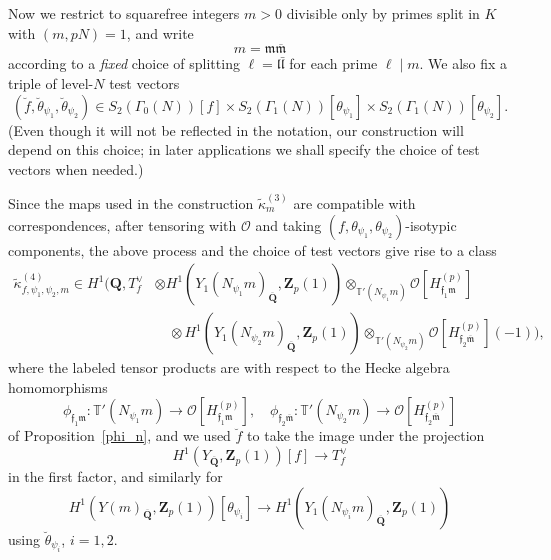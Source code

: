 \documentclass[10pt,letterpaper]{amsart}
\theoremstyle{plain}
\theoremstyle{definition}
\theoremstyle{definition}
\theoremstyle{plain}
\theoremstyle{plain}
\theoremstyle{plain}
\theoremstyle{remark}
\numberwithin{equation}{section}
\newcommand{\fkm}{\mathfrak{m}}
\newcommand{\fkmbar}{\overline{\mathfrak{m}}}
\newcommand{\fkf}{\mathfrak{f}}
\DeclareMathOperator{\et}{\acute{e}t}
\def\cO{\mathcal O}
\newcommand{\Q}{\mathbf{Q}}
\newcommand{\Z}{\mathbf{Z}}
\begin{document}
Now we restrict to squarefree integers $m>0$ divisible only by primes split in $K$ with $(m,pN)=1$, and write 
\[
m=\fkm\fkmbar
\]
according to a \emph{fixed} choice of splitting $\ell=\mathfrak{l}\bar{\mathfrak{l}}$ for each prime $\ell\mid m$. 
We also fix a triple of level-$N$ test vectors
\begin{equation}\label{eq:triple-222}
(\breve{f},\breve{\theta}_{\psi_1},\breve{\theta}_{\psi_2})\in S_2(\Gamma_0(N))[f]\times S_2(\Gamma_1(N))[\theta_{\psi_1}]\times S_2(\Gamma_1(N))[\theta_{\psi_2}].\nonumber
\end{equation}
(Even though it will not be reflected in the notation, our construction will depend on this choice; in later applications we shall specify the choice of test vectors when needed.) 

Since the maps used in the construction $\tilde{\kappa}^{(3)}_m$ are compatible with correspondences, after tensoring with $\cO$ and taking $(f,\theta_{\psi_1},\theta_{\psi_2})$-isotypic components, the above process and the choice of test vectors %
give rise to a class
\begin{align*}
\tilde{\kappa}_{f,\psi_1,\psi_2,m}^{(4)}\in H^1\bigl(\Q,T_{f}^{\vee}&\otimes H^1_{\et}(Y_1(N_{\psi_1}m)_{\overline{\Q}},\Z_p(1))\otimes_{\mathbb{T}'(N_{\psi_1}m)}\mathcal{O}[H_{\mathfrak{f}_1\fkm}^{(p)}]\\
 &\quad\otimes H^1_{\et}(Y_1(N_{\psi_2}m)_{\overline{\Q}},\Z_p(1))\otimes_{\mathbb{T}'(N_{\psi_2}m)}\mathcal{O}[H_{\mathfrak{f}_2\fkmbar}^{(p)}](-1)\bigr),
\end{align*}
where the labeled tensor products are with respect to the Hecke algebra homomorphisms
\begin{equation}\label{eq:rayclass-str}
\phi_{\mathfrak{f}_1\fkm}:\mathbb{T}'(N_{\psi_1}m)\rightarrow\mathcal{O}[H_{\mathfrak{f}_1\fkm}^{(p)}],\quad 
\phi_{\mathfrak{f}_2\fkmbar}:\mathbb{T}'(N_{\psi_2}m)\rightarrow\mathcal{O}[H_{\mathfrak{f}_2\fkmbar}^{(p)}]
\end{equation}
of Proposition~\ref{phi_n}, and we used $\breve{f}$ to take the image under the projection \[H^1_{\et}(Y_{\overline{\Q}},\Z_p(1))[f]\rightarrow T_f^\vee\] in the first factor, and similarly for \[H_{\et}^1(Y(m)_{\overline{\Q}},\Z_p(1))[\theta_{\psi_i}]\rightarrow H^1_{\et}(Y_1(N_{\psi_i}m)_{\overline{\Q}},\Z_p(1))\] using $\breve{\theta}_{\psi_i}$, $i=1,2$.
%
\end{document}
